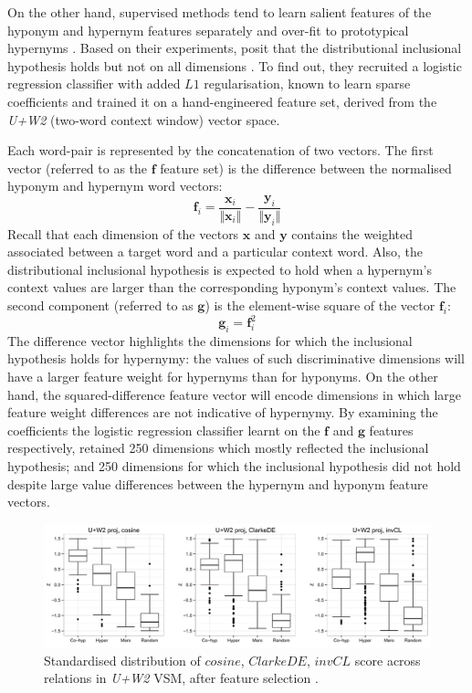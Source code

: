 On the other hand, supervised methods tend to learn salient features of the hyponym and hypernym features separately and over-fit to prototypical hypernyms \citep{levy2015supervised}.  Based on their experiments, \citeauthor{roller2014inclusive} posit that the distributional inclusional hypothesis holds but not on all dimensions \citep{roller2014inclusive}.  To find out, they recruited a logistic regression classifier with added $L1$ regularisation, known to learn sparse coefficients and trained it on a hand-engineered feature set, derived from the \textit{U+W2} (two-word context window) vector space.  

Each word-pair is represented by the concatenation of two vectors.  The first vector (referred to as the $\bm{f}$ feature set) is the difference between the normalised hyponym and hypernym word vectors: 
\[
\bm{f}_i = \frac{\bm{x}_i}{\Vert\bm{x}_i\Vert} - \frac{\bm{y}_i}{\Vert\bm{y}_i\Vert}
\]
Recall that each dimension of the vectors $\bm{x}$ and $\bm{y}$ contains the weighted associated between a target word and a particular context word.  Also, the distributional inclusional hypothesis is expected to hold when a hypernym’s context values are larger than the corresponding hyponym’s context values.  The second component (referred to as $\bm{g}$) is the element-wise square of the vector $\bm{f}_i$:
\[
\bm{g}_i = \bm{f}_i^2
\]
The difference vector highlights the dimensions for which the inclusional hypothesis holds for hypernymy: the values of such discriminative dimensions will have a larger feature weight for hypernyms than for hyponyms.  On the other hand, the squared-difference feature vector will encode dimensions in which large feature weight differences are not indicative of hypernymy.  By examining the coefficients the logistic regression classifier learnt on the $\bm{f}$ and $\bm{g}$ features respectively, \citeauthor{roller2014inclusive} retained 250 dimensions which mostly reflected the inclusional hypothesis; and 250 dimensions for which the inclusional hypothesis did not hold despite large value differences between the hypernym and hyponym feature vectors. 
\begin{figure}[ht!] 
  \centering
  \includegraphics[width=1.\linewidth]{images/std_distrib_invCL_post_feature_selection.png}
  \caption{Standardised distribution of $cosine$, $ClarkeDE$, $invCL$ score across relations in \textit{U+W2} VSM, after feature selection \citep{roller2014inclusive}.}
  \label{fig:std_invCL_boxplot_500dim}
\end{figure}
